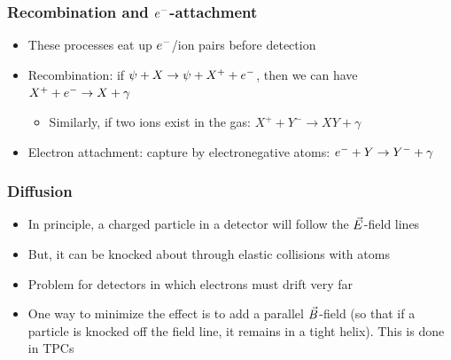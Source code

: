 \subsubsection{Recombination and $e^{-}$-attachment}
\begin{itemize}
  \item These processes eat up $e^{-}$/ion pairs before detection
  \item Recombination: if $\psi+X\rightarrow \psi+X^++e^{-}$, then we can have $X^++e^{-} \rightarrow X+\gamma$
  \begin{itemize}
    \item Similarly, if two ions exist in the gas: $X^++Y^- \rightarrow XY+\gamma$
  \end{itemize}
  \item Electron attachment: capture by electronegative atoms: $e^{-}+Y \rightarrow Y^- + \gamma$
\end{itemize}
\subsubsection{Diffusion}
\begin{itemize}
  \item In principle, a charged particle in a detector will follow the $\vec{E}$-field lines
  \item But, it can be knocked about through elastic collisions with atoms
  \item Problem for detectors in which electrons must drift very far
  \item One way to minimize the effect is to add a parallel $\vec{B}$-field (so that if a particle is knocked off the field line, it remains in a tight helix). This is done in TPCs
\end{itemize}

